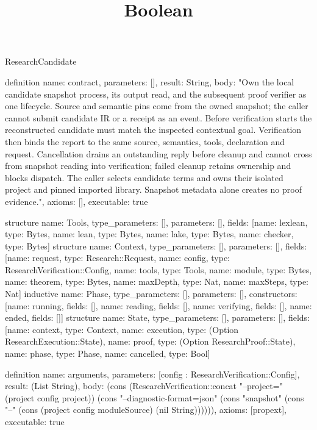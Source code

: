 \begin{lexlean}{ResearchCandidate}
\title{Boolean}
\begin{semanticmodule}

definition{
 name: contract,
 parameters: [],
 result: String,
 body: "Own the local candidate snapshot process, its output read, and the subsequent proof verifier as one lifecycle. Source and semantic pins come from the owned snapshot; the caller cannot submit candidate IR or a receipt as an event. Before verification starts the reconstructed candidate must match the inspected contextual goal. Verification then binds the report to the same source, semantics, tools, declaration and request. Cancellation drains an outstanding reply before cleanup and cannot cross from snapshot reading into verification; failed cleanup retains ownership and blocks dispatch. The caller selects candidate terms and owns their isolated project and pinned imported library. Snapshot metadata alone creates no proof evidence.",
 axioms: [],
 executable: true
}

structure{
 name: Tools,
 type_parameters: [],
 parameters: [],
 fields: [{name: lexlean, type: Bytes}, {name: lean, type: Bytes}, {name: lake, type: Bytes}, {name: checker, type: Bytes}]
}
structure{
 name: Context,
 type_parameters: [],
 parameters: [],
 fields: [{name: request, type: Research::Request}, {name: config, type: ResearchVerification::Config}, {name: tools, type: Tools}, {name: module, type: Bytes}, {name: theorem, type: Bytes}, {name: maxDepth, type: Nat}, {name: maxSteps, type: Nat}]
}
inductive{
 name: Phase,
 type_parameters: [],
 parameters: [],
 constructors: [{name: running, fields: []}, {name: reading, fields: []}, {name: verifying, fields: []}, {name: ended, fields: []}]
}
structure{
 name: State,
 type_parameters: [],
 parameters: [],
 fields: [{name: context, type: Context}, {name: execution, type: (Option ResearchExecution::State)}, {name: proof, type: (Option ResearchProof::State)}, {name: phase, type: Phase}, {name: cancelled, type: Bool}]
}

definition{
 name: arguments,
 parameters: [config : ResearchVerification::Config],
 result: (List String),
 body: (cons (ResearchVerification::concat "--project=" (project config project)) (cons "--diagnostic-format=json" (cons "snapshot" (cons "--" (cons (project config moduleSource) (nil String)))))),
 axioms: [propext],
 executable: true
}


\end{semanticmodule}
\end{lexlean}
